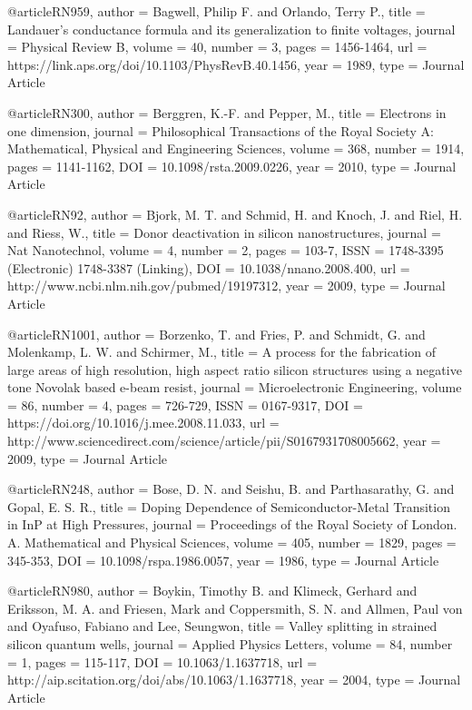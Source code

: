 @article{RN959,
   author = {Bagwell, Philip F. and Orlando, Terry P.},
   title = {Landauer's conductance formula and its generalization to finite voltages},
   journal = {Physical Review B},
   volume = {40},
   number = {3},
   pages = {1456-1464},
   url = {https://link.aps.org/doi/10.1103/PhysRevB.40.1456},
   year = {1989},
   type = {Journal Article}
}

@article{RN300,
   author = {Berggren, K.-F. and Pepper, M.},
   title = {Electrons in one dimension},
   journal = {Philosophical Transactions of the Royal Society A: Mathematical, 				Physical and Engineering Sciences},
   volume = {368},
   number = {1914},
   pages = {1141-1162},
   DOI = {10.1098/rsta.2009.0226},
   year = {2010},
   type = {Journal Article}
}

@article{RN92,
   author = {Bjork, M. T. and Schmid, H. and Knoch, J. and Riel, H. and Riess, W.},
   title = {Donor deactivation in silicon nanostructures},
   journal = {Nat Nanotechnol},
   volume = {4},
   number = {2},
   pages = {103-7},
   ISSN = {1748-3395 (Electronic)
1748-3387 (Linking)},
   DOI = {10.1038/nnano.2008.400},
   url = {http://www.ncbi.nlm.nih.gov/pubmed/19197312},
   year = {2009},
   type = {Journal Article}
}

@article{RN1001,
   author = {Borzenko, T. and Fries, P. and Schmidt, G. and Molenkamp, L. W. and Schirmer, M.},
   title = {A process for the fabrication of large areas of high resolution, high aspect ratio silicon structures using a negative tone Novolak based e-beam resist},
   journal = {Microelectronic Engineering},
   volume = {86},
   number = {4},
   pages = {726-729},
   ISSN = {0167-9317},
   DOI = {https://doi.org/10.1016/j.mee.2008.11.033},
   url = {http://www.sciencedirect.com/science/article/pii/S0167931708005662},
   year = {2009},
   type = {Journal Article}
}

@article{RN248,
   author = {Bose, D. N. and Seishu, B. and Parthasarathy, G. and Gopal, E. S. R.},
   title = {Doping Dependence of Semiconductor-Metal Transition in InP at High Pressures},
   journal = {Proceedings of the Royal Society of London. A. Mathematical and Physical Sciences},
   volume = {405},
   number = {1829},
   pages = {345-353},
   DOI = {10.1098/rspa.1986.0057},
   year = {1986},
   type = {Journal Article}
}

@article{RN980,
   author = {Boykin, Timothy B. and Klimeck, Gerhard and Eriksson, M. A. and Friesen, Mark and Coppersmith, S. N. and Allmen, Paul von and Oyafuso, Fabiano and Lee, Seungwon},
   title = {Valley splitting in strained silicon quantum wells},
   journal = {Applied Physics Letters},
   volume = {84},
   number = {1},
   pages = {115-117},
   DOI = {10.1063/1.1637718},
   url = {http://aip.scitation.org/doi/abs/10.1063/1.1637718},
   year = {2004},
   type = {Journal Article}
}

